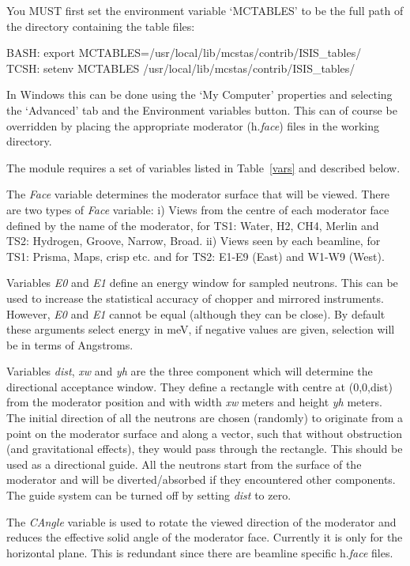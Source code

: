You MUST first set the environment variable `MCTABLES' to be the
full path of the directory containing the table files:

BASH: export MCTABLES=/usr/local/lib/mcstas/contrib/ISIS\_tables/\\
TCSH: setenv MCTABLES /usr/local/lib/mcstas/contrib/ISIS\_tables/

In Windows this can be done using the `My Computer' properties and
selecting the `Advanced' tab and the Environment variables button.
This can of course be overridden by placing the appropriate moderator (h.{\it{face}}) files in the
working directory.

The module requires a set of variables
listed in Table~\ref{vars} and described below.

The {\it Face} variable determines the moderator surface that will
be viewed. There are two types of {\it Face} variable: i)  Views
from the centre of each moderator face defined by the name of the
moderator, for TS1: Water, H2, CH4, Merlin and TS2: Hydrogen,
Groove, Narrow, Broad. ii) Views seen by each beamline, for TS1:
Prisma, Maps, crisp etc. and for TS2: E1-E9 (East) and W1-W9
(West).



Variables {\it E0} and {\it E1} define an energy window for sampled neutrons.
This can be used to increase the statistical
accuracy of chopper and mirrored instruments. However, {\it E0} and
{\it E1} cannot be equal (although they can be close). By default these arguments
select energy in meV, if negative values are given, selection will be in terms of Angstroms.

Variables {\it dist}, {\it xw} and {\it yh} are the three
component which will determine the directional acceptance window.
They define a rectangle with centre at (0,0,dist) from the
moderator position and with width {\it xw} meters and height {\it yh} meters.
The initial direction of all the neutrons are chosen (randomly) to
originate from a point on the moderator surface and along a
vector, such that without obstruction (and gravitational effects),
they would pass through the rectangle. This should be used as a
directional guide. All the neutrons start from the surface of the
moderator and will be diverted/absorbed if they encountered other
components. The guide system can be turned off by setting {\it
dist} to zero.

The {\it CAngle} variable is used to rotate the viewed direction
of the moderator and reduces the effective solid angle of the
moderator face. Currently it is only for the horizontal plane.
This is redundant since there are beamline specific h.{\it{face}} files.

